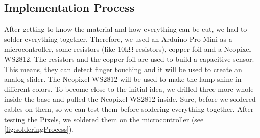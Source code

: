 \documentclass[00_doc.tex]{subfiles}
\begin{document}
    \subsection{Implementation Process}
    \begin{flushleft}
        After getting to know the material and how everything can be cut, we had to 
        solder everything together. Therefore, we used an Arduino Pro Mini \cite{arduinoProMini} 
        as a microcontroller, some resistors (like 10k\si{\ohm} resistors), copper foil and a Neopixel WS2812. \newline
        The resistors and the copper foil are used to build a capacitive sensor. \cite{Badger2019} 
        This means, they can detect finger touching and it will be used to create an analog slider.
        The Neopixel WS2812 will be used to make the lamp shine in different colors. \cite{Burgess2019} 
        \newline 
        \noindent
        To become close to the initial idea, we drilled three more whole inside the base and 
        pulled the Neopixel WS2812 inside. Sure, before we soldered cables on them, so we can 
        test them before soldering everything together. After testing the Pixels, we soldered 
        them on the microcontroller (see \ref{fig:solderingProcess}).
    \end{flushleft}
\end{document}
